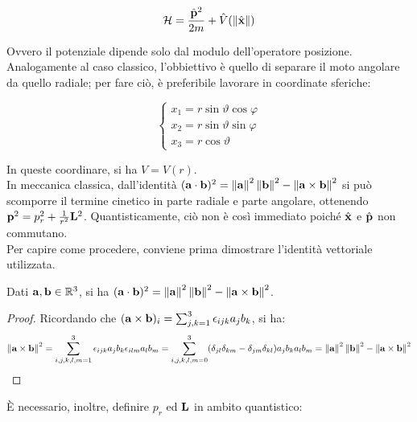 \begin{equation}
	\mathcal{H} = \frac{\hat{\mathbf{p}}^2}{2m} + \hat{V}(\left\lVert\hat{\mathbf{x}}\right\rVert)
	\label{eq:27}
\end{equation}

Ovvero il potenziale dipende solo dal modulo dell'operatore posizione.\\
Analogamente al caso classico, l'obbiettivo è quello di separare il moto angolare da quello radiale; per fare ciò, è preferibile lavorare in coordinate sferiche:

\begin{equation}
	\begin{cases}
		x_1 = r \sin \vartheta \cos \varphi \\
		x_2 = r \sin \vartheta \sin \varphi \\
		x_3 = r \cos \vartheta
	\end{cases}
	\label{eq:28}
\end{equation}

In queste coordinare, si ha $ V = V(r) $.\\
In meccanica classica, dall'identità $ (\mathbf{a}\cdot\mathbf{b})^2 = \left\lVert\mathbf{a}\right\rVert^2 \left\lVert\mathbf{b}\right\rVert^2 - \left\lVert\mathbf{a}\times\mathbf{b}\right\rVert^2 $ si può scomporre il termine cinetico in parte radiale e parte angolare, ottenendo $ \mathbf{p}^2 = p_r^2 + \frac{1}{r^2}\mathbf{L}^2 $. Quantisticamente, ciò non è così immediato poiché $ \hat{\mathbf{x}} $ e $ \hat{\mathbf{p}} $ non commutano.\\
Per capire come procedere, conviene prima dimostrare l'identità vettoriale utilizzata.

\begin{proposition}\label{cross-class}
	Dati $ \mathbf{a}, \mathbf{b} \in\mathbb{R}^3 $, si ha $ (\mathbf{a}\cdot\mathbf{b})^2 = \left\lVert\mathbf{a}\right\rVert^2 \left\lVert\mathbf{b}\right\rVert^2 - \left\lVert\mathbf{a}\times\mathbf{b}\right\rVert^2 $.
\end{proposition}
\begin{proof}
	Ricordando che $ (\mathbf{a}\times\mathbf{b})_i = \sum_{j,k = 1}^{3} \epsilon_{ijk} a_j b_k $, si ha:
	\begin{equation*}
		\left\lVert\mathbf{a}\times\mathbf{b}\right\rVert^2 = \sum_{i,j,k,l,m = 1}^{3} \epsilon_{ijk} a_j b_k \epsilon_{ilm} a_l b_m = \sum_{i,j,k,l,m = 0}^{3} (\delta_{jl}\delta_{km} - \delta_{jm}\delta_{kl}) a_j b_k a_l b_m = \left\lVert\mathbf{a}\right\rVert^2 \left\lVert\mathbf{b}\right\rVert^2 - \left\lVert\mathbf{a}\times\mathbf{b}\right\rVert^2
	\end{equation*}
\end{proof}

È necessario, inoltre, definire $ p_r $ ed $ \mathbf{L} $ in ambito quantistico:

